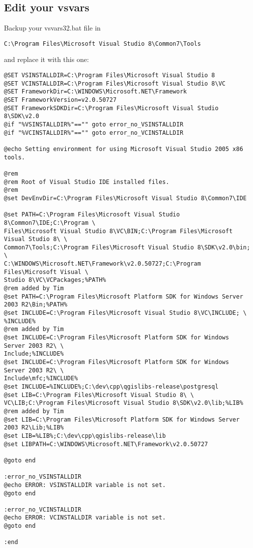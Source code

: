 \subsection{Edit your vsvars}
Backup your vsvars32.bat file in 

\begin{verbatim}
C:\Program Files\Microsoft Visual Studio 8\Common7\Tools
\end{verbatim}

and replace it with this one:

\begin{verbatim}
@SET VSINSTALLDIR=C:\Program Files\Microsoft Visual Studio 8
@SET VCINSTALLDIR=C:\Program Files\Microsoft Visual Studio 8\VC
@SET FrameworkDir=C:\WINDOWS\Microsoft.NET\Framework
@SET FrameworkVersion=v2.0.50727
@SET FrameworkSDKDir=C:\Program Files\Microsoft Visual Studio 8\SDK\v2.0
@if "%VSINSTALLDIR%"=="" goto error_no_VSINSTALLDIR
@if "%VCINSTALLDIR%"=="" goto error_no_VCINSTALLDIR

@echo Setting environment for using Microsoft Visual Studio 2005 x86 tools.

@rem
@rem Root of Visual Studio IDE installed files.
@rem
@set DevEnvDir=C:\Program Files\Microsoft Visual Studio 8\Common7\IDE

@set PATH=C:\Program Files\Microsoft Visual Studio 8\Common7\IDE;C:\Program \
Files\Microsoft Visual Studio 8\VC\BIN;C:\Program Files\Microsoft Visual Studio 8\ \
Common7\Tools;C:\Program Files\Microsoft Visual Studio 8\SDK\v2.0\bin; \
C:\WINDOWS\Microsoft.NET\Framework\v2.0.50727;C:\Program Files\Microsoft Visual \
Studio 8\VC\VCPackages;%PATH%
@rem added by Tim
@set PATH=C:\Program Files\Microsoft Platform SDK for Windows Server 2003 R2\Bin;%PATH%
@set INCLUDE=C:\Program Files\Microsoft Visual Studio 8\VC\INCLUDE; \
%INCLUDE%
@rem added by Tim
@set INCLUDE=C:\Program Files\Microsoft Platform SDK for Windows Server 2003 R2\ \
Include;%INCLUDE%
@set INCLUDE=C:\Program Files\Microsoft Platform SDK for Windows Server 2003 R2\ \
Include\mfc;%INCLUDE%
@set INCLUDE=%INCLUDE%;C:\dev\cpp\qgislibs-release\postgresql
@set LIB=C:\Program Files\Microsoft Visual Studio 8\ \
VC\LIB;C:\Program Files\Microsoft Visual Studio 8\SDK\v2.0\lib;%LIB%
@rem added by Tim
@set LIB=C:\Program Files\Microsoft Platform SDK for Windows Server 2003 R2\Lib;%LIB%
@set LIB=%LIB%;C:\dev\cpp\qgislibs-release\lib
@set LIBPATH=C:\WINDOWS\Microsoft.NET\Framework\v2.0.50727

@goto end

:error_no_VSINSTALLDIR
@echo ERROR: VSINSTALLDIR variable is not set. 
@goto end

:error_no_VCINSTALLDIR
@echo ERROR: VCINSTALLDIR variable is not set. 
@goto end

:end

\end{verbatim}

